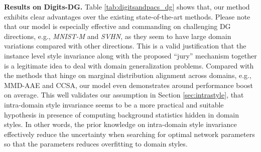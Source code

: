\documentclass[10pt,twocolumn,letterpaper]{article}
\newcommand{\0}{{\bf 0}}
\begin{document}
\textbf{Results on Digits-DG.} Table \ref{tab:digitsandpacs_dg} shows that, our method exhibits clear advantages over the existing state-of-the-art methods. Please note that our model is especially effective and commanding on challenging DG directions, e.g., \textit{MNIST-M} and \textit{SVHN}, as they seem to have large domain variations compared with other directions. This is a valid justification that the instance level style invariance along with the proposed ``jury'' mechanism together is a legitimate idea to deal with domain generalization problems. Compared with the methods that hinge on marginal distribution alignment across domains, e.g., MMD-AAE and CCSA, our model even demonstrates around  performance boost on average. This well validates our assumption in Section \ref{sec:intrastyle}, that intra-domain style invariance seems to be a more practical and suitable hypothesis in presence of computing background statistics hidden in domain styles. In other words, the prior knowledge on intra-domain style invariance effectively reduce the uncertainty when searching for optimal network parameters so that the parameters reduces overfitting to domain styles.
\end{document}
